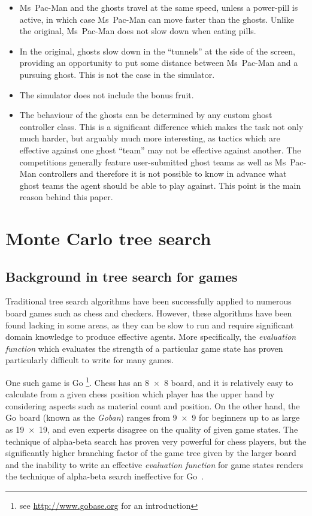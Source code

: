 \begin{itemize}
\item Ms~Pac-Man and the ghosts travel at the same speed, unless a power-pill is active, in which case Ms~Pac-Man can move faster than the ghosts.  Unlike the original, Ms~Pac-Man does not slow down when eating pills.
\item In the original, ghosts slow down in the ``tunnels'' at the side of the screen, providing an opportunity to put some distance between Ms~Pac-Man and a pursuing ghost.  This is not the case in the simulator.
\item The simulator does not include the bonus fruit.
\item The behaviour of the ghosts can be determined by any custom ghost controller class.  This is a significant difference which makes the task not only much harder, but arguably much more interesting, as tactics which are effective against one ghost ``team'' may not be effective against another.  The competitions generally feature user-submitted ghost teams as well as Ms~Pac-Man controllers and therefore it is not possible to know in advance what ghost teams the agent should be able to play against.  This point is the main reason behind this paper.
\end{itemize}

\section{Monte Carlo tree search}

\subsection{Background in tree search for games}

Traditional tree search algorithms have been successfully applied to numerous board games such as chess and checkers.  However, these algorithms have been found lacking in some areas, as they can be slow to run and require significant domain knowledge to produce effective agents.  More specifically, the \emph{evaluation function} which evaluates the strength of a particular game state has proven particularly difficult to write for many games.

One such game is Go \footnote{see \url{http://www.gobase.org} for an introduction}.  Chess has an 8~$\times$~8 board, and it is relatively easy to calculate from a given chess position which player has the upper hand by considering aspects such as material count and position.  On the other hand, the Go board (known as the \emph{Goban}) ranges from 9~$\times$~9 for beginners up to as large as 19~$\times$~19, and even experts disagree on the quality of given game states.  The technique of alpha-beta search  has proven very powerful for chess players, but the significantly higher branching factor of the game tree given by the larger board and the inability to write an effective \emph{evaluation function} for game states renders the technique of alpha-beta search ineffective for Go~\citep{Gelly2006}.

